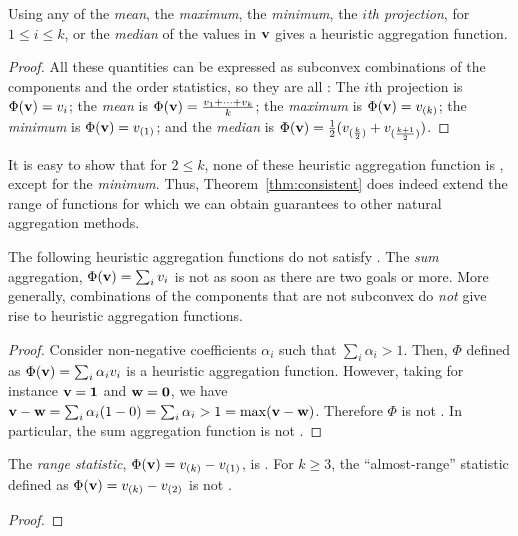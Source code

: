 \begin{corollary}
  Using any of the \emph{mean}, the \emph{maximum}, the \emph{minimum}, the \emph{$i$th projection}, for $1 \leq i \leq k$, or the \emph{median} of the values in $\mathbf{v}$ gives a \axiomcons heuristic aggregation function.
\end{corollary}
\begin{proof}
  All these quantities can be expressed as subconvex combinations of the components and the order statistics, so they are all \axiomcons:
  The $i$th projection is $\Phi(\mathbf{v}) = v_i$; the \emph{mean} is $\Phi(\mathbf{v}) = \frac{v_1 + \dots + v_k}{k}$; the \emph{maximum} is $\Phi(\mathbf{v})= v_{(k)}$; the \emph{minimum} is $\Phi(\mathbf{v}) = v_{(1)}$; and the \emph{median} is $\Phi(\mathbf{v}) = \frac{1}{2}(v_{(\frac{k}{2})} + v_{(\frac{k+1}{2})})$.
\end{proof}

It is easy to show that for $2 \leq k$, none of these heuristic aggregation function is \axiomadm, except for the \emph{minimum}.
Thus, Theorem~\ref{thm:consistent} does indeed extend the range of functions for which we can obtain guarantees to other natural aggregation methods.

\begin{observation}
  The following heuristic aggregation functions do not satisfy \axiomcons.
  The \emph{sum} aggregation, $\Phi(\mathbf{v}) = \sum_i v_i$ is not \axiomcons as soon as there are two goals or more.
  More generally, combinations of the components that are not subconvex do \emph{not} give rise to \axiomcons heuristic aggregation functions.
\end{observation}
\begin{proof}
  Consider non-negative coefficients $\alpha_i$ such that $\sum_i \alpha_i > 1$.
  Then, $\Phi$ defined as $\Phi(\mathbf{v}) = \sum_i \alpha_i v_i$ is a heuristic aggregation function.
  However, taking for instance $\mathbf{v} = \mathbf{1}$ and $\mathbf{w} = \mathbf{0}$, we have $\mathbf{v} - \mathbf{w} = \sum_i \alpha_i (1 - 0) = \sum_i \alpha_i > 1 = \max (\mathbf{v} - \mathbf{w})$.
  Therefore $\Phi$ is not \axiomcons.
  In particular, the sum aggregation function is not \axiomcons.
\end{proof}

\begin{observation}
  The \emph{range statistic}, $\Phi(\mathbf{v}) = v_{(k)} - v_{(1)}$, is \axiomcons.
  For $k \geq 3$, the ``almost-range'' statistic defined as $\Phi(\mathbf{v}) = v_{(k)} - v_{(2)}$ is not \axiomcons.
\end{observation}
\begin{proof}
\end{proof}

